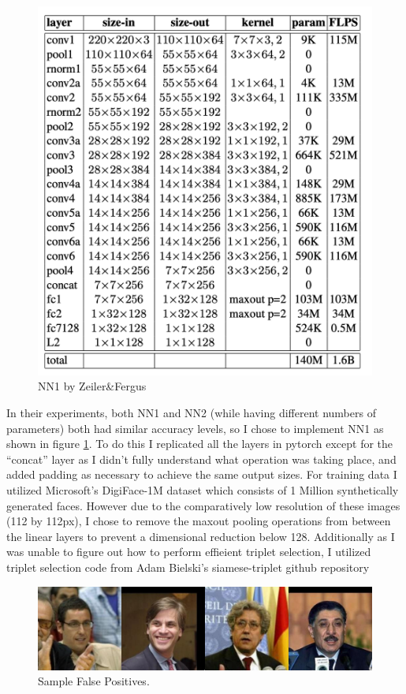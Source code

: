 \documentclass[10pt,twocolumn,letterpaper]{article}
\begin{document}
\begin{figure}[t]
   \begin{center}
      \includegraphics[width=0.8\linewidth]{NN1.png}
   \end{center}
      \caption{NN1 by Zeiler\&Fergus }
   \label{fig:NN1}
   \end{figure}

In their experiments, both NN1 and NN2 (while having different numbers of parameters) both had similar accuracy levels, so I chose to implement NN1 as shown in figure \ref{fig:NN1}.
To do this I replicated all the layers in pytorch except for the “concat” layer as I didn't fully understand what operation was taking place, and added padding as necessary to achieve the same output sizes.
For training data I utilized Microsoft's DigiFace-1M dataset which consists of 1 Million synthetically generated faces.
However due to the comparatively low resolution of these images (112 by 112px), I chose to remove the maxout pooling operations from between the linear layers to prevent a dimensional reduction below 128.
Additionally as I was unable to figure out how to perform effieient triplet selection, I utilized triplet selection code from Adam Bielski's siamese-triplet github repository


\begin{figure}
   \begin{center}
      \includegraphics[width=0.8\linewidth]{False Positives.png}
   \end{center}
      \caption{Sample False Positives.}
   \label{fig:falsePositives}
   \end{figure}
\end{document}
